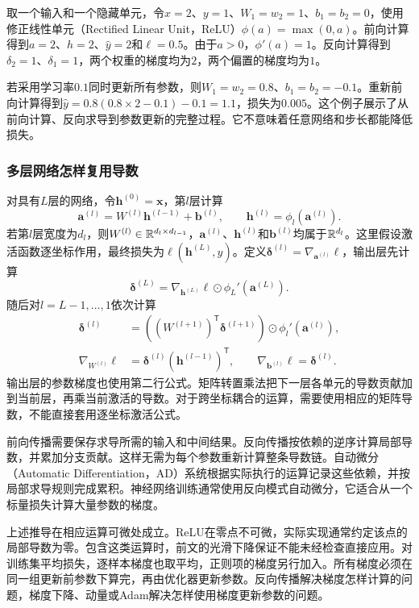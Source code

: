 取一个输入和一个隐藏单元，令$x=2$、$y=1$、$W_1=w_2=1$、$b_1=b_2=0$，使用修正线性单元（Rectified Linear Unit，ReLU）$\phi(a)=\max(0,a)$。前向计算得到$a=2$、$h=2$、$\hat y=2$和$\ell=0.5$。由于$a>0$，$\phi'(a)=1$。反向计算得到$\delta_2=1$、$\delta_1=1$，两个权重的梯度均为$2$，两个偏置的梯度均为$1$。

若采用学习率$0.1$同时更新所有参数，则$W_1=w_2=0.8$、$b_1=b_2=-0.1$。重新前向计算得到$\hat y=0.8(0.8\times2-0.1)-0.1=1.1$，损失为$0.005$。这个例子展示了从前向计算、反向求导到参数更新的完整过程。它不意味着任意网络和步长都能降低损失。

\subsubsection{多层网络怎样复用导数}
对具有$L$层的网络，令$\bm h^{(0)}=\bm x$，第$l$层计算
\begin{equation}
 \bm a^{(l)}=W^{(l)}\bm h^{(l-1)}+\bm b^{(l)},\qquad
 \bm h^{(l)}=\phi_l(\bm a^{(l)}).
\end{equation}
若第$l$层宽度为$d_l$，则$W^{(l)}\in\mathbb{R}^{d_l\times d_{l-1}}$，$\bm a^{(l)}$、$\bm h^{(l)}$和$\bm b^{(l)}$均属于$\mathbb{R}^{d_l}$。这里假设激活函数逐坐标作用，最终损失为$\ell(\bm h^{(L)},y)$。定义$\bm\delta^{(l)}=\nabla_{\bm a^{(l)}}\ell$，输出层先计算
\begin{equation}
 \bm\delta^{(L)}=\nabla_{\bm h^{(L)}}\ell\odot\phi_L'(\bm a^{(L)}).
\end{equation}
随后对$l=L-1,\ldots,1$依次计算
\begin{align}
 \bm\delta^{(l)}
 &=\left((W^{(l+1)})^{\mathsf T}\bm\delta^{(l+1)}\right)
   \odot\phi_l'(\bm a^{(l)}),\\
 \nabla_{W^{(l)}}\ell
 &=\bm\delta^{(l)}(\bm h^{(l-1)})^{\mathsf T},\qquad
 \nabla_{\bm b^{(l)}}\ell=\bm\delta^{(l)}.
 \label{eq:solving-backprop-recursion}
\end{align}
输出层的参数梯度也使用第二行公式。矩阵转置乘法把下一层各单元的导数贡献加到当前层，再乘当前激活的导数。对于跨坐标耦合的运算，需要使用相应的矩阵导数，不能直接套用逐坐标激活公式。

前向传播需要保存求导所需的输入和中间结果。反向传播按依赖的逆序计算局部导数，并累加分支贡献。这样无需为每个参数重新计算整条导数链。自动微分（Automatic Differentiation，AD）系统根据实际执行的运算记录这些依赖，并按局部求导规则完成累积。神经网络训练通常使用反向模式自动微分，它适合从一个标量损失计算大量参数的梯度。

上述推导在相应运算可微处成立。ReLU在零点不可微，实际实现通常约定该点的局部导数为零。包含这类运算时，前文的光滑下降保证不能未经检查直接应用。对训练集平均损失，逐样本梯度也取平均，正则项的梯度另行加入。所有梯度必须在同一组更新前参数下算完，再由优化器更新参数。反向传播解决梯度怎样计算的问题，梯度下降、动量或Adam解决怎样使用梯度更新参数的问题。

